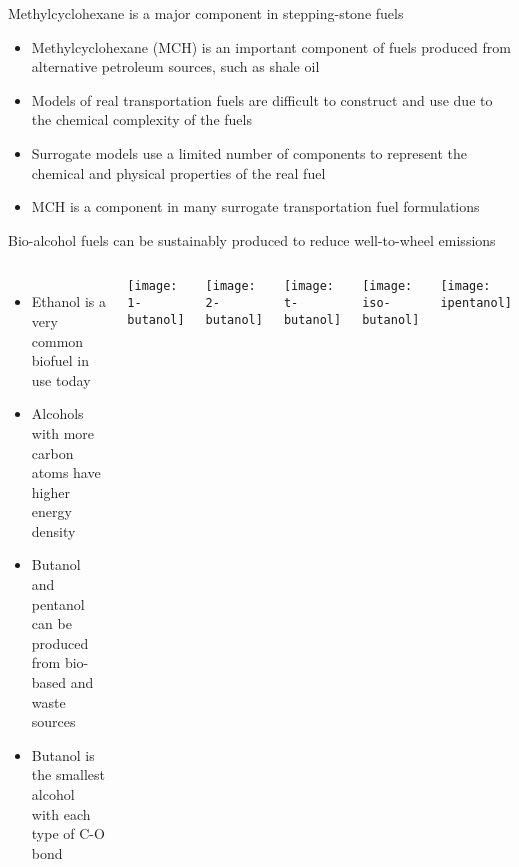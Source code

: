 \documentclass{beamer}
\begin{document}
\begin{frame}{Methylcyclohexane is a major component in stepping-stone fuels}
    \begin{itemize}
        \item Methylcyclohexane (MCH) is an important component of fuels
            produced from alternative petroleum sources, such as shale oil
        \item Models of real transportation fuels are difficult to
            construct and use due to the chemical complexity of the fuels
        \item Surrogate models use a limited number of components to
            represent the chemical and physical properties of the real fuel
        \item MCH is a component in many surrogate transportation fuel
            formulations
    \end{itemize}
\end{frame}


\begin{frame}{Bio-alcohol fuels can be sustainably produced to reduce well-to-wheel emissions}
    \begin{columns}
            \begin{itemize}
                \item Ethanol is a very common biofuel in use today
                \item Alcohols with more carbon atoms have higher energy density
                \item Butanol and pentanol can be produced from bio-based and waste sources
                \item Butanol is the smallest alcohol with each type of C-O bond
            \end{itemize}
            \centering
            \texttt{[image: 1-butanol]}\par
            \texttt{[image: 2-butanol]}\par
            \texttt{[image: t-butanol]}\par
            \texttt{[image: iso-butanol]}\par
            \texttt{[image: ipentanol]}
    \end{columns}
\end{frame}
\end{document}
